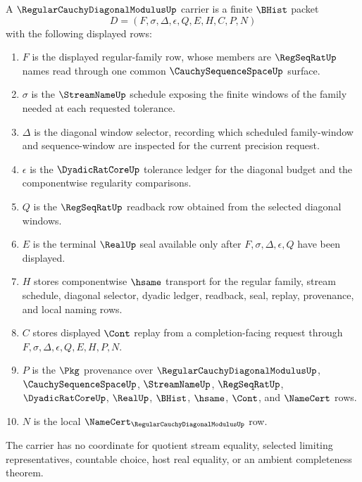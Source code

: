 \begin{definition}
\label{def:regular-cauchy-diagonal-modulus-carrier}
A $\RegularCauchyDiagonalModulusUp$ carrier is a finite $\BHist$ packet
$$
D=(F,\sigma,\Delta,\epsilon,Q,E,H,C,P,N)
$$
with the following displayed rows:
\begin{enumerate}
\item $F$ is the displayed regular-family row, whose members are $\RegSeqRatUp$ names read through one common $\CauchySequenceSpaceUp$ surface.
\item $\sigma$ is the $\StreamNameUp$ schedule exposing the finite windows of the family needed at each requested tolerance.
\item $\Delta$ is the diagonal window selector, recording which scheduled family-window and sequence-window are inspected for the current precision request.
\item $\epsilon$ is the $\DyadicRatCoreUp$ tolerance ledger for the diagonal budget and the componentwise regularity comparisons.
\item $Q$ is the $\RegSeqRatUp$ readback row obtained from the selected diagonal windows.
\item $E$ is the terminal $\RealUp$ seal available only after $F,\sigma,\Delta,\epsilon,Q$ have been displayed.
\item $H$ stores componentwise $\hsame$ transport for the regular family, stream schedule, diagonal selector, dyadic ledger, readback, seal, replay, provenance, and local naming rows.
\item $C$ stores displayed $\Cont$ replay from a completion-facing request through $F,\sigma,\Delta,\epsilon,Q,E,H,P,N$.
\item $P$ is the $\Pkg$ provenance over $\RegularCauchyDiagonalModulusUp$, $\CauchySequenceSpaceUp$, $\StreamNameUp$, $\RegSeqRatUp$, $\DyadicRatCoreUp$, $\RealUp$, $\BHist$, $\hsame$, $\Cont$, and $\NameCert$ rows.
\item $N$ is the local $\NameCert_{\RegularCauchyDiagonalModulusUp}$ row.
\end{enumerate}
The carrier has no coordinate for quotient stream equality, selected limiting representatives, countable choice, host real equality, or an ambient completeness theorem.
\end{definition}

